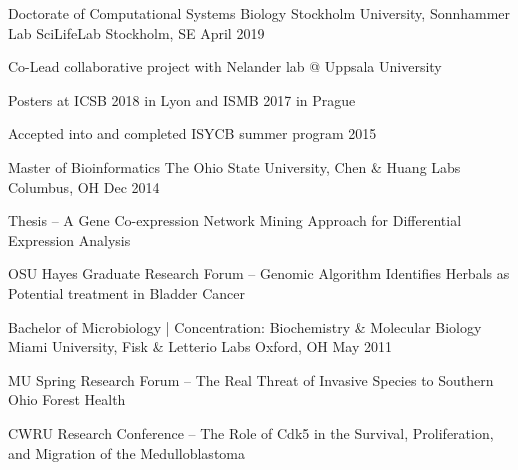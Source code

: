 \begin{cventries}
  \cventry
    {Doctorate of Computational Systems Biology }
    {Stockholm University, Sonnhammer Lab}
    {SciLifeLab Stockholm, SE }
    {April 2019}
    {
      \begin{cvitems}
        \item {Co-Lead collaborative project with Nelander lab @ Uppsala University}
        \item {Posters at ICSB 2018 in Lyon and ISMB 2017 in Prague}
        \item {Accepted into and completed ISYCB summer program 2015}
      \end{cvitems}
    }
    \cventry
    {Master of Bioinformatics}
    {The Ohio State University, Chen \& Huang Labs}
    {Columbus, OH }
    {Dec 2014}
    {
      \begin{cvitems}
        \item {Thesis -- A Gene Co-expression Network Mining Approach for Differential Expression Analysis } 
		\item{OSU Hayes Graduate Research Forum -- Genomic Algorithm Identifies Herbals as Potential treatment in Bladder Cancer }
      \end{cvitems}
    }
    \cventry
    {Bachelor of Microbiology | Concentration: Biochemistry \& Molecular Biology  }
    {Miami University, Fisk \& Letterio Labs}
    {Oxford, OH }
    {May 2011}
    {
      \begin{cvitems}
        \item {MU Spring Research Forum -- The Real Threat of Invasive Species to Southern Ohio Forest Health }
        \item{CWRU Research Conference -- The Role of Cdk5 in the Survival, Proliferation, and Migration of the Medulloblastoma }
      \end{cvitems}
    }
\end{cventries}
